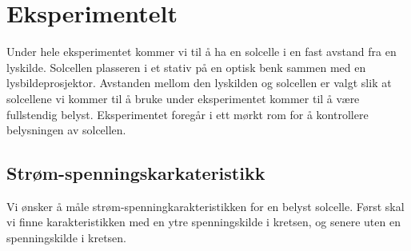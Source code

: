 \documentclass[%
 reprint,
 amsmath,amssymb,
 aps,
 norsk,
 booktabs
]{revtex4-1}
\begin{document}
\section{Eksperimentelt}
Under hele eksperimentet kommer vi til å ha en solcelle i en fast avstand fra en lyskilde. Solcellen plasseren i et stativ på en optisk benk sammen med en lysbildeprosjektor. Avstanden mellom den lyskilden og solcellen er valgt slik at solcellene vi kommer til å bruke under eksperimentet kommer til å være fullstendig belyst. Eksperimentet foregår i ett mørkt rom for å kontrollere belysningen av solcellen.\\
\subsection{Strøm-spenningskarkateristikk}
Vi ønsker å måle strøm-spenningkarakteristikken for en belyst solcelle. Først skal vi finne karakteristikken med en ytre spenningskilde i kretsen, og senere uten en spenningskilde i kretsen.
\end{document}
